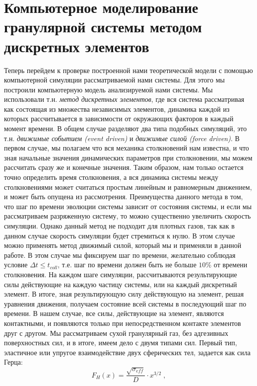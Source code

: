 \chapter{Компьютерное моделирование гранулярной системы методом дискретных элементов}
\label{cha:research}

Теперь перейдем к проверке построенной нами теоретической модели с помощью компьютерной симуляции рассматриваемой нами системы.
Для этого мы построили компьютерную модель анализируемой нами системы. Мы использовали т.н. \emph{метод дискретных элементов},
где вся система рассматривая как состоящая из множества независимых элементов, динамика каждой из которых рассчитывается 
в зависимости от окружающих факторов в каждый момент времени. В общем случае разделяют два типа подобных симуляций,
это т.н. \emph{движимые событием (event driven)} и \emph{движимые силой (force driven)}. В первом случае, мы полагаем что
вся механика столкновений нам известна, и что зная начальные значения динамических параметров при столкновении, мы можем 
рассчитать сразу же и конечные значения. Таким образом, нам только остается точно определить время столкновения, а вся
динамика системы между столкновениями может считаться простым линейным и равномерным движением, и может быть опущена из рассмотрения.
Преимущества данного метода в том, что шаг по времени эволюции системы зависит от состояния системы, и если мы рассматриваем
разряженную систему, то можно существенно увеличить скорость симуляции. Однако данный метод не подходит для плотных газов,
так как в данном случае скорость симуляции будет стремиться к нулю. В этом случае можно применять метод движимый силой, 
который мы и применяли в данной работе. В этом случае мы фиксируем шаг по времени, желательно соблюдая условие $\Delta t\leq t_{coll}$,
т.е. шаг по времени должен быть не больше $10\%$ от времени столкновения. На каждом шаге симуляции, рассчитываются результирующие 
силы действующие на каждую частицу системы, или на каждый дискретный элемент. В итоге, зная результирующую силу действующую на 
элемент, решая уравнения движения, получаем состояние всей системы в последующий шаг по времени. В нашем случае, все силы,
действующие на элемент, являются контактными, и появляются только при непосредственном контакте элементов друг с другом.
Мы рассматриваем сухой гранулярный газ, без адгезивных поверхностных сил, и в итоге, имеем дело с двумя типами сил. Первый тип,
эластичное или упругое взаимодействие двух сферических тел, задается как сила Герца:
\begin{equation}
  F_H(x) = \frac{\sqrt{\sigma_{eff}}}{D}\cdot x^{3/2}\;,
\end{equation}

